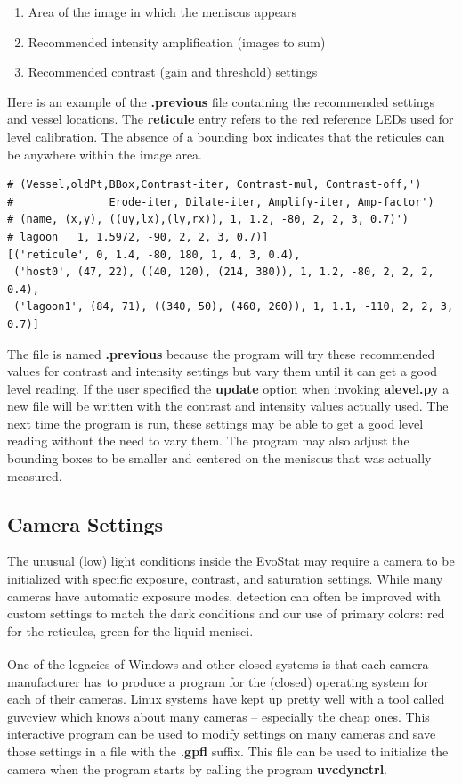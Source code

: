 \documentclass[10pt,letterpaper]{article}
\begin{document}
\begin{enumerate}[itemsep=1pt, topsep=2pt, partopsep=0pt]
\item Area of the image in which the meniscus appears
\item Recommended intensity amplification (images to sum)
\item Recommended contrast (gain and threshold) settings
\end{enumerate}
Here is an example of the {\bf .previous} file containing the recommended settings and vessel locations.  The {\bf reticule} entry refers to the red reference LEDs used for level calibration.  The absence of a bounding box indicates that the reticules can be anywhere within the image area.
\begin{verbatim}
# (Vessel,oldPt,BBox,Contrast-iter, Contrast-mul, Contrast-off,')
#               Erode-iter, Dilate-iter, Amplify-iter, Amp-factor')
# (name, (x,y), ((uy,lx),(ly,rx)), 1, 1.2, -80, 2, 2, 3, 0.7)')
# lagoon   1, 1.5972, -90, 2, 2, 3, 0.7)]
[('reticule', 0, 1.4, -80, 180, 1, 4, 3, 0.4),
 ('host0', (47, 22), ((40, 120), (214, 380)), 1, 1.2, -80, 2, 2, 2, 0.4),
 ('lagoon1', (84, 71), ((340, 50), (460, 260)), 1, 1.1, -110, 2, 2, 3, 0.7)]
\end{verbatim}

The file is named {\bf .previous} because the program will try these recommended values for contrast and intensity settings but vary them until it can get a good level reading.  If the user specified the {\bf update} option when invoking {\bf alevel.py} a new file will be written with the contrast and intensity values actually used.  The next time the program is run, these settings may be able to get a good level reading without the need to vary them.  The program may also adjust the bounding boxes to be smaller and centered on the meniscus that was actually measured.

\subsection*{Camera Settings}
The unusual (low) light conditions inside the EvoStat may require a camera to be initialized with specific exposure, contrast, and saturation settings. While many cameras have automatic exposure modes, detection can often be improved with custom settings to match the dark conditions and our use of primary colors: red for the reticules, green for the liquid menisci.

One of the legacies of
Windows\textsuperscript{\textregistered}
and other closed systems is that each camera manufacturer has to produce a program for the (closed) operating system for each of their cameras.  Linux systems have kept up pretty well with a tool called guvcview which knows about many cameras -- especially the cheap ones.  This interactive program can be used to modify settings on many cameras and save those settings in a file with the {\bf .gpfl} suffix.  This file can be used to initialize the camera when the program starts by calling the program {\bf uvcdynctrl}.
\end{document}
